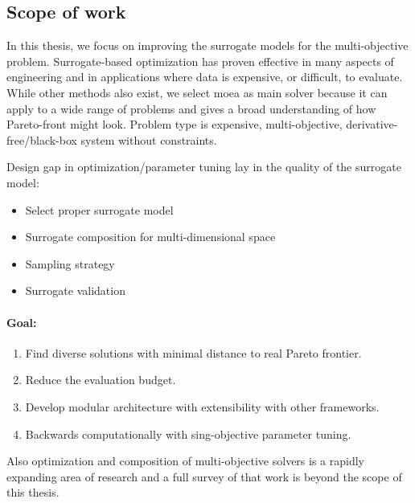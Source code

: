         \subsection{Scope of work}
        In this thesis, we focus on improving the surrogate models for the multi-objective problem. Surrogate-based optimization has proven effective in many aspects of engineering and in applications where data is expensive, or difficult, to evaluate. While other methods also exist, we select \gls{moea} as main solver because it can apply to a wide range of problems and gives a broad understanding of how Pareto-front might look. Problem type is expensive, multi-objective, derivative-free/black-box system without constraints.

        Design gap in optimization/parameter tuning lay in the quality of the surrogate model:
            \begin{itemize}
                \item Select proper surrogate model
                \item Surrogate composition for multi-dimensional space
                \item Sampling strategy
                \item Surrogate validation
            \end{itemize}

        \paragraph{Goal:}
        \begin{enumerate}
            \item Find diverse solutions with minimal distance to real Pareto frontier.
            \item Reduce the evaluation budget.
            \item Develop modular architecture with extensibility with other frameworks. 
            \item Backwards computationally with sing-objective parameter tuning.
        \end{enumerate}

        Also optimization and composition of multi-objective solvers is a rapidly expanding area of research and a full survey of that work is beyond the scope of this thesis.






